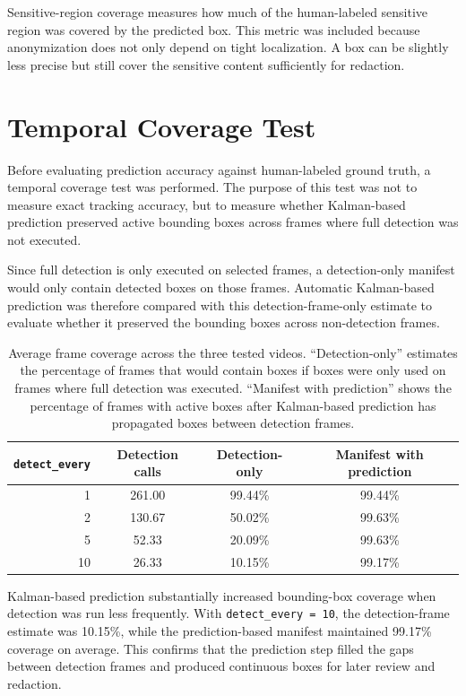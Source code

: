 Sensitive-region coverage measures how much of the human-labeled sensitive region was covered by the predicted box. This metric was included because anonymization does not only depend on tight localization. A box can be slightly less precise but still cover the sensitive content sufficiently for redaction.

\section{Temporal Coverage Test}

Before evaluating prediction accuracy against human-labeled ground truth, a temporal coverage test was performed. The purpose of this test was not to measure exact tracking accuracy, but to measure whether Kalman-based prediction preserved active \gls{bounding box}es across frames where full detection was not executed.

Since full detection is only executed on selected frames, a detection-only manifest would only contain detected boxes on those frames. Automatic Kalman-based prediction was therefore compared with this detection-frame-only estimate to evaluate whether it preserved the \gls{bounding box}es across non-detection frames.

\begin{table}[H]
\centering
\begin{tabular}{rccc}
\toprule
\textbf{\texttt{detect\_every}} & \textbf{Detection calls} & \textbf{Detection-only} & \textbf{Manifest with prediction} \\
\midrule
1  & 261.00 & 99.44\% & 99.44\% \\
2  & 130.67 & 50.02\% & 99.63\% \\
5  & 52.33  & 20.09\% & 99.63\% \\
10 & 26.33  & 10.15\% & 99.17\% \\
\bottomrule
\end{tabular}
\caption{Average frame coverage across the three tested videos. ``Detection-only'' estimates the percentage of frames that would contain boxes if boxes were only used on frames where full detection was executed. ``Manifest with prediction'' shows the percentage of frames with active boxes after Kalman-based prediction has propagated boxes between detection frames.}
\label{tab:video_temporal_coverage}
\end{table}

Kalman-based prediction substantially increased bounding-box coverage when detection was run less frequently. With \texttt{detect\_every = 10}, the detection-frame estimate was 10.15\%, while the prediction-based manifest maintained 99.17\% coverage on average. This confirms that the prediction step filled the gaps between detection frames and produced continuous boxes for later review and redaction.

